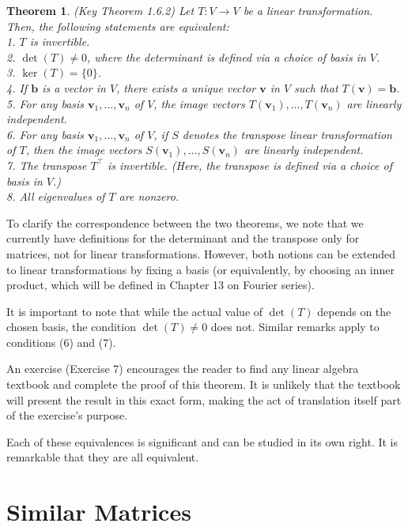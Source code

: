 \documentclass[
]{book}
\newtheorem{theorem}{Theorem}[chapter]
\theoremstyle{definition}
\theoremstyle{definition}
\theoremstyle{definition}
\theoremstyle{definition}
\theoremstyle{remark}
\begin{document}
\begin{theorem}
(Key Theorem 1.6.2) Let \(T: V \to V\) be a linear transformation. Then, the following statements are equivalent:\\
1. \(T\) is invertible.\\
2. \(\det(T) \neq 0\), where the determinant is defined via a choice of basis in \(V\).\\
3. \(\ker(T) = \{0\}\).\\
4. If \(\mathbf{b}\) is a vector in \(V\), there exists a unique vector \(\mathbf{v}\) in \(V\) such that \(T(\mathbf{v}) = \mathbf{b}\).\\
5. For any basis \(\mathbf{v}_1, \dots, \mathbf{v}_n\) of \(V\), the image vectors \(T(\mathbf{v}_1), \dots, T(\mathbf{v}_n)\) are linearly independent.\\
6. For any basis \(\mathbf{v}_1, \dots, \mathbf{v}_n\) of \(V\), if \(S\) denotes the transpose linear transformation of \(T\), then the image vectors \(S(\mathbf{v}_1), \dots, S(\mathbf{v}_n)\) are linearly independent.\\
7. The transpose \(T^\top\) is invertible. \emph{(Here, the transpose is defined via a choice of basis in \(V\).)}\\
8. All eigenvalues of \(T\) are nonzero.
\end{theorem}

To clarify the correspondence between the two theorems, we note that we currently have definitions for the determinant and the transpose only for matrices, not for linear transformations. However, both notions can be extended to linear transformations by fixing a basis (or equivalently, by choosing an inner product, which will be defined in Chapter 13 on Fourier series).

It is important to note that while the actual value of \(\det(T)\) depends on the chosen basis, the condition \(\det(T) \neq 0\) does not. Similar remarks apply to conditions (6) and (7).

An exercise (Exercise 7) encourages the reader to find any linear algebra textbook and complete the proof of this theorem. It is unlikely that the textbook will present the result in this exact form, making the act of translation itself part of the exercise's purpose.

Each of these equivalences is significant and can be studied in its own right. It is remarkable that they are all equivalent.

\hypertarget{similar-matrices}{%
\section{Similar Matrices}\label{similar-matrices}}
\end{document}
